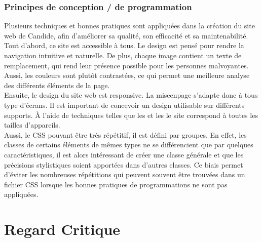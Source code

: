 \documentclass[a4,10pt,french]{sphinxmanual}
\begin{document}
\subsection{Principes de conception / de programmation}
\label{\detokenize{chapitre-02:principes-de-conception-de-programmation}}
\sphinxAtStartPar
Plusieurs techniques et bonnes pratiques sont appliquées dans la création du site web de Candide, afin d’améliorer sa qualité, son efficacité et sa maintenabilité.\\
Tout d’abord, ce site est accessible à tous. Le design est pensé pour rendre la navigation intuitive et naturelle. De plus, chaque image contient un texte de remplacement, qui rend leur présence possible pour les personnes malvoyantes. Aussi, les couleurs sont plutôt contrastées, ce qui permet une meilleure analyse des différents éléments de la page.\\
Ensuite, le design du site web est responsive. La mise\sphinxhyphen{}en\sphinxhyphen{}page s’adapte donc à tous type d’écrans. Il est important de concevoir un design utilisable sur différents supports. À l’aide de techniques telles que les  et les  le site correspond à toutes les tailles d’appareils.\\
Aussi, le CSS pouvant être très répétitif, il est défini par groupes. En effet, les classes de certains éléments de mêmes types ne se différencient que par quelques caractéristiques, il est alors intéressant de créer une classe générale et que les précisions stylistiques soient apportées dans d’autres classes. Ce biais permet d’éviter les nombreuses répétitions qui peuvent souvent être trouvées dans un fichier CSS lorsque les bonnes pratiques de programmations ne sont pas appliquées.


\chapter{Regard Critique}
\label{\detokenize{chapitre-03:regard-critique}}\label{\detokenize{chapitre-03::doc}}
\end{document}
